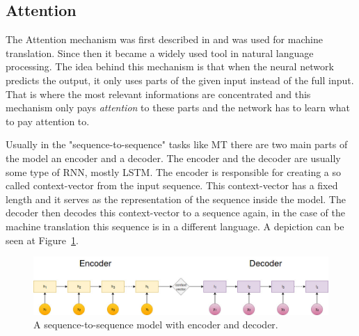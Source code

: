\subsection{Attention}
The Attention mechanism was first described in \cite{Bahdanau:2015} and was used for machine translation. Since then it became a widely used tool in natural language processing. The idea behind this mechanism is that when the neural network predicts the output, it only uses parts of the given input instead of the full input. That is where the most relevant informations are concentrated and this mechanism only pays \textit{attention} to these parts and the network has to learn what to pay attention to.

Usually in the "sequence-to-sequence" tasks like MT there are two main parts of the model an encoder and a decoder. The encoder and the decoder are usually some type of RNN, mostly LSTM. The encoder is responsible for creating a so called context-vector from the input sequence. This context-vector has a fixed length and it serves as the representation of the sequence inside the model. The decoder then decodes this context-vector to a sequence again, in the case of the machine translation this sequence is in a different language. A depiction can be seen at Figure~\ref{fig:seq_to_seq}.
\begin{figure}[!htb]
	\centering
	\includegraphics[scale=0.4]{seq_to_seq.jpg}
	\caption{A sequence-to-sequence model with encoder and decoder.}
	\label{fig:seq_to_seq}
\end{figure}

